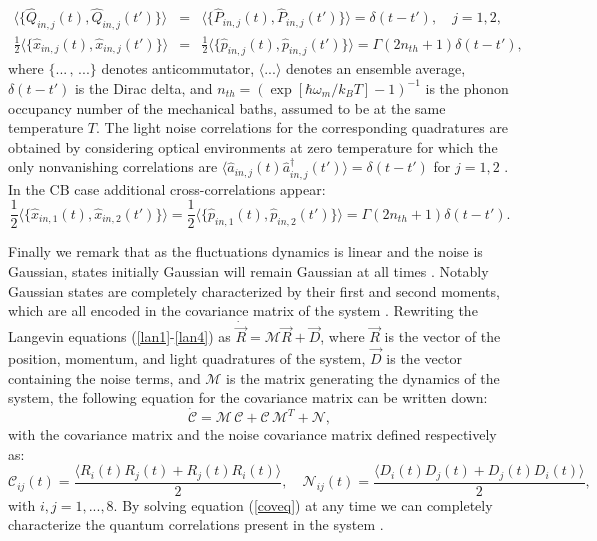 \documentclass[a4paper]{jpconf}
\begin{document}
\begin{eqnarray}\label{corr}
\langle \big\{\hat{Q}_{in,j}(t),\hat{Q}_{in,j}(t')\big\}\rangle&=&\langle 
\big\{\hat{P}_{in,j}(t),\hat{P}_{in,j}(t')\big\}\rangle=\delta(t-t'), \quad 
j=1,2,\\
\frac{1}{2}\langle 
\big\{\hat{x}_{in,j}(t),\hat{x}_{in,j}(t')\big\}\rangle&=&\frac{1}{2}\langle 
\big\{\hat{p}_{in,j}(t),\hat{p}_{in,j}(t')\big\}\rangle=\Gamma(2n_{th}
+1)\delta(t-t'),
\end{eqnarray}
where $\{...\, ,\,...\}$ denotes anticommutator, $\langle ... \rangle$ 
denotes an ensemble average, $\delta(t-t')$ is the Dirac delta, and 
$n_{th}=(\exp[\hbar\omega_m/k_B T]-1)^{-1}$ is the phonon occupancy number of the 
mechanical baths, assumed to be at the same temperature $T$.  The light noise correlations for the corresponding quadratures are obtained
by considering optical environments at zero temperature for which the only nonvanishing correlations are $\langle \hat{a}_{in,j}(t)
\hat{a}^\dagger_{in,j}(t') \rangle=\delta(t-t')$ for $j=1,2$ \cite{22}. In the CB case 
additional cross-correlations appear:
\begin{equation}\label{crossnoise}
\frac{1}{2}\langle 
\big\{\hat{x}_{in,1}(t),\hat{x}_{in,2}(t')\big\}\rangle=\frac{1}{2}\langle 
\big\{\hat{p}_{in,1}(t),\hat{p}_{in,2}(t')\big\}\rangle=\Gamma(2n_{th}
+1)\delta(t-t').
\end{equation}

Finally we remark that as the fluctuations dynamics is linear and the noise is 
Gaussian, states initially Gaussian   will remain Gaussian at all 
times \cite{50,51}. Notably Gaussian states are completely characterized by 
their first and second moments, which are all encoded in the covariance matrix 
of the system \cite{50,51}. Rewriting the Langevin equations (\ref{lan1}-\ref{lan4}) as 
$\dot{\vec{R}}=\mathcal{M}\vec{R}+\vec{D}$, where $\vec{R}$ is the vector of the 
position, momentum, and light quadratures of the system, $\vec{D}$ is the vector 
containing the noise terms, and $\mathcal{M}$ is the matrix generating the 
dynamics of the system, the following equation for the covariance matrix can be 
written down:
\begin{equation}\label{coveq}
\dot{\mathcal{C}}=\mathcal{M}\, \mathcal{C}+\mathcal{C}\, 
\mathcal{M}^T+\mathcal{N},
\end{equation}
with the covariance matrix  and the noise covariance matrix defined respectively 
as:
\begin{equation}
\mathcal{C}_{ij}(t)=\frac{\langle R_i(t) R_j(t)+ R_j(t) R_i(t)\rangle}{2}, \quad 
\mathcal{N}_{ij}(t)=\frac{\langle D_i(t) D_j(t)+ D_j(t) D_i(t)\rangle}{2},
\end{equation} 
with $i,j=1,...,8$. By solving equation (\ref{coveq}) at any time we can completely 
characterize the quantum correlations present in the system \cite{52,53}.
\end{document}
